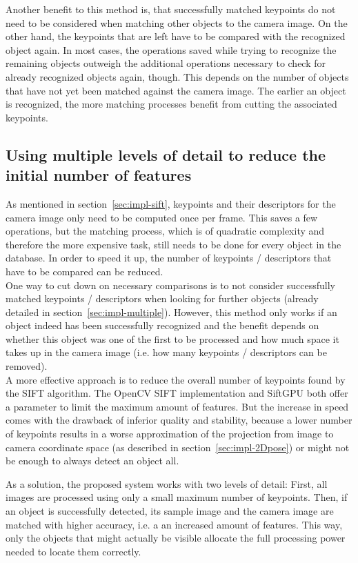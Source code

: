Another benefit to this method is, that successfully matched keypoints do not need to be considered when matching other objects to the camera image. On the other hand, the keypoints that are left have to be compared with the recognized object again. In most cases, the operations saved while trying to recognize the remaining objects outweigh the additional operations necessary to check for already recognized objects again, though. This depends on the number of objects that have not yet been matched against the camera image. The earlier an object is recognized, the more matching processes benefit from cutting the associated keypoints.

\subsection{Using multiple levels of detail to reduce the initial number of features}
\label{sec:impl-mipmap}
As mentioned in section~\ref{sec:impl-sift}, keypoints and their descriptors for the camera image only need to be computed once per frame. This saves a few operations, but the matching process, which is of quadratic complexity and therefore the more expensive task, still needs to be done for every object in the database. In order to speed it up, the number of keypoints / descriptors that have to be compared can be reduced. \\

One way to cut down on necessary comparisons is to not consider successfully matched keypoints / descriptors when looking for further objects (already detailed in section~\ref{sec:impl-multiple}). However, this method only works if an object indeed has been successfully recognized and the benefit depends on whether this object was one of the first to be processed and how much space it takes up in the camera image (i.e. how many keypoints / descriptors can be removed). \\

A more effective approach is to reduce the overall number of keypoints found by the SIFT algorithm. The OpenCV SIFT implementation and SiftGPU both offer a parameter to limit the maximum amount of features. But the increase in speed comes with the drawback of inferior quality and stability, because a lower number of keypoints results in a worse approximation of the projection from image to camera coordinate space (as described in section~\ref{sec:impl-2Dpose}) or might not be enough to always detect an object all.

As a solution, the proposed system works with two levels of detail: First, all images are processed using only a small maximum number of keypoints. Then, if an object is successfully detected, its sample image and the camera image are matched with higher accuracy, i.e. a an increased amount of features. This way, only the objects that might actually be visible allocate the full processing power needed to locate them correctly.


